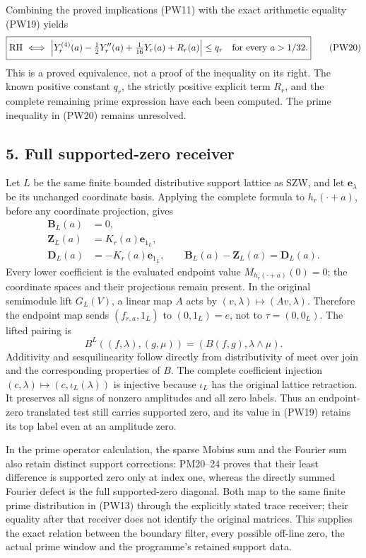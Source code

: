 \documentclass[
  10pt,
  a4paper,
]{article}
\begin{document}
Combining the proved implications (PW11) with the exact arithmetic
equality (PW19) yields \[
\boxed{\mathrm{RH}\ \Longleftrightarrow\
 \left|Y_r^{(4)}(a)-\tfrac12Y_r''(a)+\tfrac1{16}Y_r(a)+R_r(a)\right|
 \le q_r\quad\hbox{for every }a>1/32.}
\tag{PW20}
\] This is a proved equivalence, not a proof of the inequality on its
right. The known positive constant \(q_r\), the strictly positive
explicit term \(R_r\), and the complete remaining prime expression have
each been computed. The prime inequality in (PW20) remains unresolved.

\subsection{5. Full supported-zero
receiver}\label{full-supported-zero-receiver}

Let \(L\) be the same finite bounded distributive support lattice as
SZW, and let \(\mathbf e_\lambda\) be its unchanged coordinate basis.
Applying the complete formula to \(h_r(\cdot+a)\), before any coordinate
projection, gives \[
\begin{aligned}
 \boldsymbol B_L(a)&=0,\\
 \boldsymbol Z_L(a)&=K_r(a)\mathbf e_{1_L},\\
 \boldsymbol D_L(a)&=-K_r(a)\mathbf e_{1_L},\qquad
 \boldsymbol B_L(a)-\boldsymbol Z_L(a)=\boldsymbol D_L(a).
\end{aligned}
\tag{PW21}
\] Every lower coefficient is the evaluated endpoint value
\(M_{h_r(\cdot+a)}(0)=0\); the coordinate spaces and their projections
remain present. In the original semimodule lift \(G_L(V)\), a linear map
\(A\) acts by \((v,\lambda)\mapsto(Av,\lambda)\). Therefore the endpoint
map sends \((f_{r,a},1_L)\) to \((0,1_L)=e\), not to \(\tau=(0,0_L)\).
The lifted pairing is \[
 B^L((f,\lambda),(g,\mu))=(B(f,g),\lambda\wedge\mu).
\tag{PW22}
\] Additivity and sesquilinearity follow directly from distributivity of
meet over join and the corresponding properties of \(B\). The complete
coefficient injection \((c,\lambda)\mapsto(c,\iota_L(\lambda))\) is
injective because \(\iota_L\) has the original lattice retraction. It
preserves all signs of nonzero amplitudes and all zero labels. Thus an
endpoint-zero translated test still carries supported zero, and its
value in (PW19) retains its top label even at an amplitude zero.

In the prime operator calculation, the sparse Mobius sum and the Fourier
sum also retain distinct support corrections: PM20--24 proves that their
least difference is supported zero only at index one, whereas the
directly summed Fourier defect is the full supported-zero diagonal. Both
map to the same finite prime distribution in (PW13) through the
explicitly stated trace receiver; their equality after that receiver
does not identify the original matrices. This supplies the exact
relation between the boundary filter, every possible off-line zero, the
actual prime window and the programme's retained support data.
\end{document}
